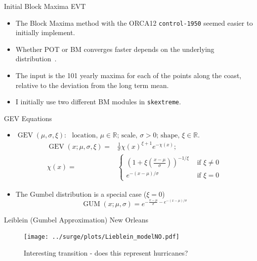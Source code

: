 \begin{frame}{Initial Block Maxima EVT }
\begin{itemize}
    \item The Block Maxima method with the ORCA12
    \texttt{control-1950} seemed easier to initially implement.
    \item Whether POT or BM converges faster depends
          on the underlying distribution~\cite{bucher2018horse}.
    \item The input is the 101 yearly maxima for each of the points along the coast,
         relative to the deviation from the long term mean.
    \item I initially use two different BM modules in \texttt{skextreme}.
    \end{itemize}
    \end{frame}
    \begin{frame}{GEV Equations }
    \begin{itemize}
\item
\(
\operatorname{GEV}(\mu, \sigma, \xi):
\)
\(
\text{ location, } \mu \in \mathbb{R}
\text{; scale, } \sigma>0
\text{; shape, } \xi \in \mathbb{R}.
\)
\begin{eqnarray}
\operatorname{GEV}(x; \mu, \sigma, \xi)=&
\frac{1}{\sigma} \chi(x)^{\xi+1} e^{-\chi(x)};\\
\chi(x)=&\left\{\begin{array}{ll}
\left(1+\xi\left(\frac{x-\mu}{\sigma}\right)\right)^{-1 / \xi} & \text { if } \xi \neq 0 \\
e^{-(x-\mu) / \sigma} & \text { if } \xi=0
\end{array}\right.
\end{eqnarray}
\item The Gumbel distribution is a special case ($\xi=0$)
\begin{equation}
\operatorname{GUM}(x ; \mu, \sigma)=e^{-\frac{x-\mu}{\sigma}-e^{-(x-\mu) / \sigma}}
\end{equation}
\end{itemize}
\end{frame}


\begin{frame}{Leiblein (Gumbel Approximation) New Orleans}
\vspace{-20pt}
 \begin{minipage}{1.0\textwidth}
\begin{figure}[htb!]
    \centering
    \texttt{[image: ../surge/plots/Lieblein\_modelNO.pdf]}
    \vspace{-15pt}
   \caption{Interesting transition - does this represent hurricanes? }
    \label{fig:}
\end{figure}
\end{minipage}
\end{frame}


